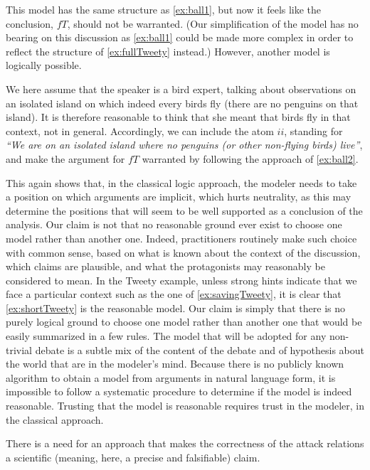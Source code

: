 \documentclass[version=3.21, pagesize, twoside=off, bibliography=totoc, DIV=calc, fontsize=12pt, a4paper, french, english]{scrartcl}
\begin{document}
This model has the same structure as \cref{ex:ball1}, but now it feels like the conclusion, $\mathit{fT}$, should not be warranted. (Our simplification of the model has no bearing on this discussion as \cref{ex:ball1} could be made more complex in order to reflect the structure of \cref{ex:fullTweety} instead.) However, another model is logically possible.
\begin{example}
	\label{ex:savingTweety}
	We here assume that the speaker is a bird expert, talking about observations on an isolated island on which indeed every birds fly (there are no penguins on that island). It is therefore reasonable to think that she meant that birds fly in that context, not in general. Accordingly, we can include the atom $\mathit{ii}$, standing for \emph{“We are on an isolated island where no penguins (or other non-flying birds) live”}, and make the argument for $\mathit{fT}$ warranted by following the approach of \cref{ex:ball2}.
\end{example}

This again shows that, in the classical logic approach, the modeler needs to take a position on which arguments are implicit, which hurts neutrality, as this may determine the positions that will seem to be well supported as a conclusion of the analysis. Our claim is not that no reasonable ground ever exist to choose one model rather than another one. Indeed, practitioners routinely make such choice with common sense, based on what is known about the context of the discussion, which claims are plausible, and what the protagonists may reasonably be considered to mean. In the Tweety example, unless strong hints indicate that we face a particular context such as the one of \cref{ex:savingTweety}, it is clear that \cref{ex:shortTweety} is the reasonable model. Our claim is simply that there is no purely logical ground to choose one model rather than another one that would be easily summarized in a few rules. The model that will be adopted for any non-trivial debate is a subtle mix of the content of the debate and of hypothesis about the world that are in the modeler’s mind. Because there is no publicly known algorithm to obtain a model from arguments in natural language form, it is impossible to follow a systematic procedure to determine if the model is indeed reasonable. Trusting that the model is reasonable requires trust in the modeler, in the classical approach.

There is a need for an approach that makes the correctness of the attack relations a scientific (meaning, here, a precise and falsifiable) claim.
\end{document}
